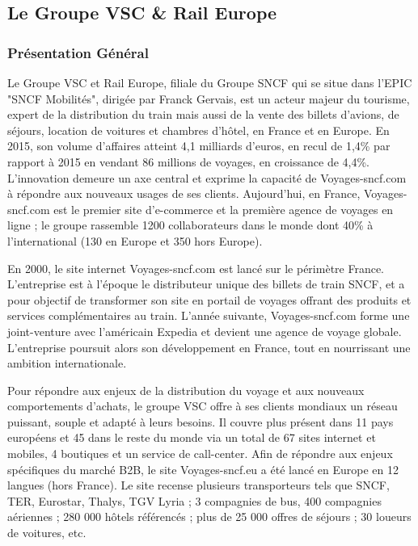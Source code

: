 \subsection{Le Groupe VSC \& Rail Europe}
\subsubsection{Présentation Général}

Le Groupe VSC et Rail Europe, filiale du Groupe SNCF qui se situe dans l'EPIC "SNCF Mobilités", dirigée par Franck Gervais, est un acteur majeur du tourisme, expert de la distribution du train mais aussi de la vente des billets d'avions, de séjours, location de voitures et chambres d'hôtel, en France et en Europe. En 2015, son volume d’affaires atteint 4,1 milliards d’euros, en recul de 1,4\% par rapport à 2015 en vendant 86 millions de voyages, en croissance de 4,4\%. L’innovation demeure un axe central et exprime la capacité de Voyages-sncf.com à répondre aux nouveaux usages de ses clients. Aujourd’hui, en France, Voyages-sncf.com est le premier site d’e-commerce et la première agence de voyages en ligne ; le groupe rassemble 1200 collaborateurs dans le monde dont 40\% à l'international (130 en Europe et 350 hors Europe).

En 2000, le site internet Voyages-sncf.com est lancé sur le périmètre France. L’entreprise est à l’époque le distributeur unique des billets de train SNCF, et a pour objectif de transformer son site en portail de voyages offrant des produits et services complémentaires au train. L’année suivante, Voyages-sncf.com forme une joint-venture avec l’américain Expedia et devient une agence de voyage globale. L’entreprise poursuit alors son développement en France, tout en nourrissant une ambition internationale.

Pour répondre aux enjeux de la distribution du voyage et aux nouveaux comportements d’achats, le groupe VSC offre à ses clients mondiaux un réseau puissant, souple et adapté à leurs besoins. Il couvre plus présent dans 11 pays européens et 45 dans le reste du monde via un total de 67 sites internet et mobiles, 4 boutiques et un service de call-center. Afin de répondre aux enjeux spécifiques du marché B2B, le site Voyages-sncf.eu a été lancé en Europe en 12 langues (hors France).
Le site recense plusieurs transporteurs tels que SNCF, TER, Eurostar, Thalys, TGV Lyria ; 3 compagnies de bus, 400 compagnies aériennes ; 280 000 hôtels référencés ; plus de 25 000 offres de séjours ; 30 loueurs de voitures, etc.


